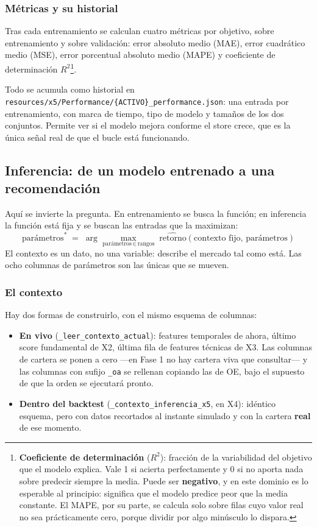 \documentclass[11pt,a4paper]{article}
\newcommand{\code}[1]{\texttt{\small #1}}
\newcommand{\bigsep}{\par\vspace{3pt}}
\begin{document}
\subsubsection{Métricas y su historial}

Tras cada entrenamiento se calculan cuatro métricas por objetivo, sobre entrenamiento y sobre
validación: error absoluto medio (MAE), error cuadrático medio (MSE), error porcentual
absoluto medio (MAPE) y coeficiente de determinación
$R^2$\footnote{\textbf{Coeficiente de determinación} ($R^2$): fracción de la variabilidad del
objetivo que el modelo explica. Vale 1 si acierta perfectamente y 0 si no aporta nada sobre
predecir siempre la media. Puede ser \textbf{negativo}, y en este dominio es lo esperable al
principio: significa que el modelo predice peor que la media constante. El MAPE, por su parte,
se calcula solo sobre filas cuyo valor real no sea prácticamente cero, porque dividir por algo
minúsculo lo dispara.}.

\bigsep
Todo se acumula como historial en
\code{resources/x5/Performance/\{ACTIVO\}_performance.json}: una entrada por entrenamiento,
con marca de tiempo, tipo de modelo y tamaños de los dos conjuntos. Permite ver si el modelo
mejora conforme el store crece, que es la única señal real de que el bucle está funcionando.

\subsection{Inferencia: de un modelo entrenado a una recomendación}

Aquí se invierte la pregunta. En entrenamiento se busca la función; en inferencia la función
está fija y se buscan las entradas que la maximizan:
\[
\text{parámetros}^{*} \;=\; \arg\max_{\text{parámetros} \,\in\, \text{rangos}}
\; \widehat{\text{retorno}}(\text{contexto fijo},\, \text{parámetros})
\]
El contexto es un dato, no una variable: describe el mercado tal como está. Las ocho columnas
de parámetros son las únicas que se mueven.

\subsubsection{El contexto}

Hay dos formas de construirlo, con el mismo esquema de columnas:

\begin{itemize}[leftmargin=1.4em,itemsep=2pt]
\item \textbf{En vivo} (\code{_leer_contexto_actual}): features temporales de ahora, último
score fundamental de X2, última fila de features técnicas de X3. Las columnas de cartera se
ponen a cero —en Fase 1 no hay cartera viva que consultar— y las columnas con sufijo
\code{_oa} se rellenan copiando las de OE, bajo el supuesto de que la orden se ejecutará
pronto.
\item \textbf{Dentro del backtest} (\code{_contexto_inferencia_x5}, en X4): idéntico
esquema, pero con datos recortados al instante simulado y con la cartera \textbf{real} de ese
momento.
\end{itemize}
\end{document}
